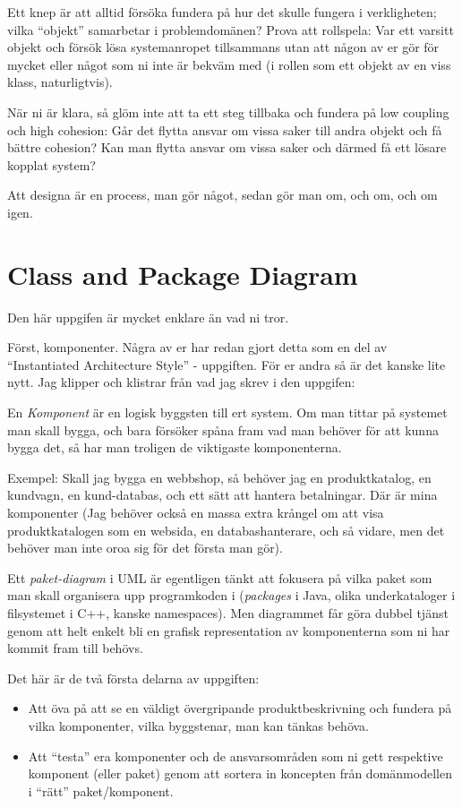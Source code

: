 \documentclass[8pt,oneside]{memoir}
\begin{document}
Ett knep är att alltid försöka fundera på hur det skulle fungera i verkligheten; vilka ``objekt'' samarbetar i problemdomänen? Prova att rollspela: Var ett varsitt objekt och försök lösa systemanropet tillsammans utan att någon av er gör för mycket eller något som ni inte är bekväm med (i rollen som ett objekt av en viss klass, naturligtvis).

När ni är klara, så glöm inte att ta ett steg tillbaka och fundera på low coupling och high cohesion: Går det flytta ansvar om vissa saker till andra objekt och få bättre cohesion? Kan man flytta ansvar om vissa saker och därmed få ett lösare kopplat system?

Att designa är en process, man gör något, sedan gör man om, och om, och om igen.
\chapter{Class and Package Diagram}
\label{sec:org0b390c7}
Den här uppgifen är mycket enklare än vad ni tror.

Först, komponenter. Några av er har redan gjort detta som en del av ``Instantiated Architecture Style'' - uppgiften. För er andra så är det kanske lite nytt. Jag klipper och klistrar från vad jag skrev i den uppgifen:

En \emph{Komponent} är en logisk byggsten till ert system. Om man tittar på systemet man skall bygga, och bara försöker spåna fram vad man behöver för att kunna bygga det, så har man troligen de viktigaste komponenterna.

Exempel: Skall jag bygga en webbshop, så behöver jag en produktkatalog, en kundvagn, en kund-databas, och ett sätt att hantera betalningar. Där är mina komponenter (Jag behöver också en massa extra krångel om att visa produktkatalogen som en websida, en databashanterare, och så vidare, men det behöver man inte oroa sig för det första man gör).

Ett \emph{paket-diagram} i UML är egentligen tänkt att fokusera på vilka paket som man skall organisera upp programkoden i (\emph{packages} i Java, olika underkataloger i filsystemet i C++, kanske namespaces). Men diagrammet får göra dubbel tjänst genom att helt enkelt bli en grafisk representation av komponenterna som ni har kommit fram till behövs.

Det här är de två första delarna av uppgiften:

\begin{itemize}
\item Att öva på att se en väldigt övergripande produktbeskrivning och fundera på vilka komponenter, vilka byggstenar, man kan tänkas behöva.
\item Att ``testa'' era komponenter och de ansvarsområden som ni gett respektive komponent (eller paket) genom att sortera in koncepten från domänmodellen i ``rätt'' paket/komponent.
\end{itemize}
\end{document}
